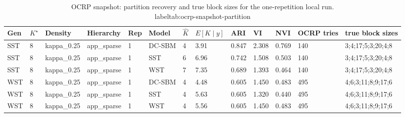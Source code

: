 \begin{table}[!h]
\centering
\caption{OCRP snapshot: partition recovery and true block sizes for the one-repetition local run.\\label{tab:ocrp-snapshot-partition}}
\centering
\begin{tabular}[t]{lllllllllllll}
\toprule
Gen & $K^\star$ & Density & Hierarchy & Rep & Model & $\hat K$ & $E[K\mid y]$ & ARI & VI & NVI & OCRP tries & true block sizes\\
\midrule
SST & 8 & kappa_0.25 & app_sparse & 1 & DC-SBM & 4 & 3.91 & 0.847 & 2.308 & 0.769 & 140 & 3;4;17;5;3;20;4;8\\
SST & 8 & kappa_0.25 & app_sparse & 1 & SST & 6 & 6.96 & 0.742 & 1.508 & 0.503 & 140 & 3;4;17;5;3;20;4;8\\
SST & 8 & kappa_0.25 & app_sparse & 1 & WST & 7 & 7.35 & 0.689 & 1.393 & 0.464 & 140 & 3;4;17;5;3;20;4;8\\
WST & 8 & kappa_0.25 & app_sparse & 1 & DC-SBM & 4 & 4.48 & 0.605 & 1.450 & 0.483 & 495 & 4;6;3;11;8;9;17;6\\
WST & 8 & kappa_0.25 & app_sparse & 1 & SST & 4 & 5.63 & 0.605 & 1.320 & 0.440 & 495 & 4;6;3;11;8;9;17;6\\
WST & 8 & kappa_0.25 & app_sparse & 1 & WST & 4 & 5.56 & 0.605 & 1.450 & 0.483 & 495 & 4;6;3;11;8;9;17;6\\
\bottomrule
\end{tabular}
\end{table}
